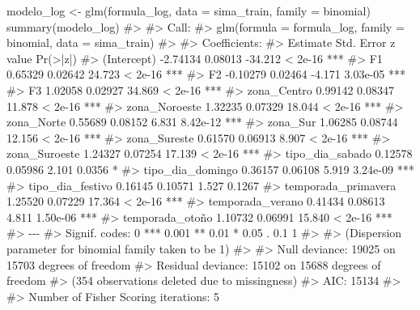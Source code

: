 \documentclass[
  spanish,
  letterpaper,
  DIV=11,
  numbers=noendperiod]{scrartcl}
\newenvironment{Shaded}{\begin{snugshade}}{\end{snugshade}}
\newcommand{\AttributeTok}[1]{\textcolor[rgb]{0.40,0.45,0.13}{#1}}
\newcommand{\CommentTok}[1]{\textcolor[rgb]{0.37,0.37,0.37}{#1}}
\newcommand{\FunctionTok}[1]{\textcolor[rgb]{0.28,0.35,0.67}{#1}}
\newcommand{\NormalTok}[1]{\textcolor[rgb]{0.00,0.23,0.31}{#1}}
\newcommand{\OtherTok}[1]{\textcolor[rgb]{0.00,0.23,0.31}{#1}}
\begin{document}
\begin{Shaded}
\begin{Highlighting}[]
\NormalTok{modelo\_log }\OtherTok{\textless{}{-}} \FunctionTok{glm}\NormalTok{(formula\_log, }\AttributeTok{data =}\NormalTok{ sima\_train, }\AttributeTok{family =}\NormalTok{ binomial)}
\FunctionTok{summary}\NormalTok{(modelo\_log)}
\CommentTok{\#\textgreater{} }
\CommentTok{\#\textgreater{} Call:}
\CommentTok{\#\textgreater{} glm(formula = formula\_log, family = binomial, data = sima\_train)}
\CommentTok{\#\textgreater{} }
\CommentTok{\#\textgreater{} Coefficients:}
\CommentTok{\#\textgreater{}                     Estimate Std. Error z value Pr(\textgreater{}|z|)    }
\CommentTok{\#\textgreater{} (Intercept)         {-}2.74134    0.08013 {-}34.212  \textless{} 2e{-}16 ***}
\CommentTok{\#\textgreater{} F1                   0.65329    0.02642  24.723  \textless{} 2e{-}16 ***}
\CommentTok{\#\textgreater{} F2                  {-}0.10279    0.02464  {-}4.171 3.03e{-}05 ***}
\CommentTok{\#\textgreater{} F3                   1.02058    0.02927  34.869  \textless{} 2e{-}16 ***}
\CommentTok{\#\textgreater{} zona\_Centro          0.99142    0.08347  11.878  \textless{} 2e{-}16 ***}
\CommentTok{\#\textgreater{} zona\_Noroeste        1.32235    0.07329  18.044  \textless{} 2e{-}16 ***}
\CommentTok{\#\textgreater{} zona\_Norte           0.55689    0.08152   6.831 8.42e{-}12 ***}
\CommentTok{\#\textgreater{} zona\_Sur             1.06285    0.08744  12.156  \textless{} 2e{-}16 ***}
\CommentTok{\#\textgreater{} zona\_Sureste         0.61570    0.06913   8.907  \textless{} 2e{-}16 ***}
\CommentTok{\#\textgreater{} zona\_Suroeste        1.24327    0.07254  17.139  \textless{} 2e{-}16 ***}
\CommentTok{\#\textgreater{} tipo\_dia\_sabado      0.12578    0.05986   2.101   0.0356 *  }
\CommentTok{\#\textgreater{} tipo\_dia\_domingo     0.36157    0.06108   5.919 3.24e{-}09 ***}
\CommentTok{\#\textgreater{} tipo\_dia\_festivo     0.16145    0.10571   1.527   0.1267    }
\CommentTok{\#\textgreater{} temporada\_primavera  1.25520    0.07229  17.364  \textless{} 2e{-}16 ***}
\CommentTok{\#\textgreater{} temporada\_verano     0.41434    0.08613   4.811 1.50e{-}06 ***}
\CommentTok{\#\textgreater{} temporada\_otoño      1.10732    0.06991  15.840  \textless{} 2e{-}16 ***}
\CommentTok{\#\textgreater{} {-}{-}{-}}
\CommentTok{\#\textgreater{} Signif. codes:  0 \textquotesingle{}***\textquotesingle{} 0.001 \textquotesingle{}**\textquotesingle{} 0.01 \textquotesingle{}*\textquotesingle{} 0.05 \textquotesingle{}.\textquotesingle{} 0.1 \textquotesingle{} \textquotesingle{} 1}
\CommentTok{\#\textgreater{} }
\CommentTok{\#\textgreater{} (Dispersion parameter for binomial family taken to be 1)}
\CommentTok{\#\textgreater{} }
\CommentTok{\#\textgreater{}     Null deviance: 19025  on 15703  degrees of freedom}
\CommentTok{\#\textgreater{} Residual deviance: 15102  on 15688  degrees of freedom}
\CommentTok{\#\textgreater{}   (354 observations deleted due to missingness)}
\CommentTok{\#\textgreater{} AIC: 15134}
\CommentTok{\#\textgreater{} }
\CommentTok{\#\textgreater{} Number of Fisher Scoring iterations: 5}
\end{Highlighting}
\end{Shaded}
\end{document}
